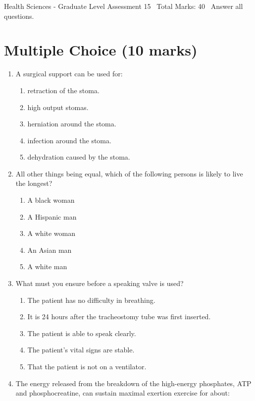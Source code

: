 \documentclass[12pt]{article}
\begin{document}
\begin{center}
Health Sciences - Graduate Level Assessment 15 \
Total Marks: 40 \
Answer all questions.
\end{center}

\section*{Multiple Choice (10 marks)}
\begin{enumerate}[label=\arabic*.]
\item A surgical support can be used for:
\begin{enumerate}[label=(\alph*)]
    \item retraction of the stoma.
    \item high output stomas.
    \item herniation around the stoma.
    \item infection around the stoma.
    \item dehydration caused by the stoma.
\end{enumerate}
\item All other things being equal, which of the following persons is likely to live the longest?
\begin{enumerate}[label=(\alph*)]
    \item A black woman
    \item A Hispanic man
    \item A white woman
    \item An Asian man
    \item A white man
\end{enumerate}
\item What must you ensure before a speaking valve is used?
\begin{enumerate}[label=(\alph*)]
    \item The patient has no difficulty in breathing.
    \item It is 24 hours after the tracheostomy tube was first inserted.
    \item The patient is able to speak clearly.
    \item The patient's vital signs are stable.
    \item That the patient is not on a ventilator.
\end{enumerate}
\item The energy released from the breakdown of the high-energy phosphates, ATP and phosphocreatine, can sustain maximal exertion exercise for about:
\begin{enumerate}[label=(\alph*)]

\end{enumerate}
\end{enumerate}
\end{document}
